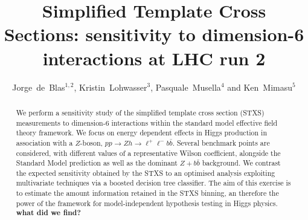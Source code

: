 \documentclass[11pt]{cernrep}
\begin{document}
\title{
Simplified Template Cross Sections: sensitivity to dimension-6 interactions at LHC run 2}
\author{Jorge~de~Blas$^{1,2}$,
Kristin~Lohwasser$^3$, Pasquale~Musella$^4$ and Ken~Mimasu$^5$}
\maketitle

\begin{abstract}
We perform a sensitivity study of the simplified template cross section (STXS) measurements to dimension-6 interactions within the standard model effective field theory framework. We focus on energy dependent effects in Higgs production in association with a $Z$-boson, $p p \to Z h \to \ell^+\ell^- b\bar{b}$. Several benchmark points are considered, with different values of a representative Wilson coefficient, alongside the Standard Model prediction as well as the dominant $Z+b\bar{b}$ background. We contrast the expected sensitivity obtained by the STXS to an optimised analysis exploiting multivariate techniques via a boosted decision tree classifier. The aim of this exercise is to estimate the amount information retained in the STXS binning, an therefore the power of the framework for model-independent hypothesis testing in Higgs physics. \textbf{what did we find?}
\end{abstract}


\newpage
\end{document}

